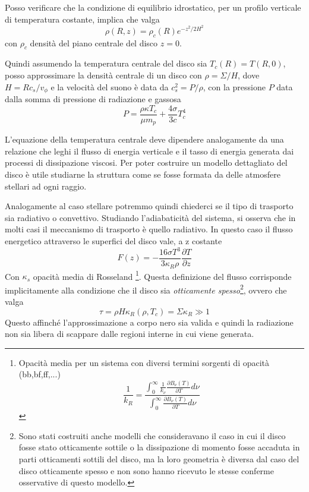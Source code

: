 \documentclass[a4paperbi]{article}
\begin{document}
	Posso verificare che la condizione di equilibrio idrostatico, per un profilo verticale di temperatura costante, implica che valga
	\begin{equation*}
		\rho(R,z)=\rho_c(R)e^{-z^2/2H^2}
	\end{equation*}
	con $\rho_c$ densità del piano centrale del disco $z=0$.
	
	Quindi assumendo la temperatura centrale del disco sia $T_c(R)=T(R,0)$, posso approssimare la densità centrale di un disco con $\rho=\Sigma/H$, dove $H=Rc_s/v_\phi$ e la velocità del suono è data da $c_s^2=P/\rho$, con la pressione $P$ data dalla somma di pressione di radiazione e gassosa
	\begin{equation}
		P=\frac{\rho\kappa T_c}{\mu m_p}+\frac{4\sigma}{3c}T_c^4
	\end{equation}
	
	L'equazione della temperatura centrale deve dipendere analogamente da una relazione che leghi il flusso di energia verticale e il tasso di energia generata dai processi di dissipazione viscosi. Per poter costruire un modello dettagliato del disco è utile studiarne la struttura come se fosse formata da delle atmosfere stellari ad ogni raggio. 
	
	Analogamente al caso stellare potremmo quindi chiederci se il tipo di trasporto sia  radiativo o convettivo. Studiando l'adiabaticità del sistema, si osserva che in molti casi il meccanismo di trasporto è quello radiativo. In questo caso il flusso energetico attraverso le superfici del disco vale, a z costante
	\begin{equation}
		F(z)=-\frac{16\sigma T^3}{3\kappa_R\rho}\frac{\partial T}{\partial z}
	\end{equation}
	Con $\kappa_s$ opacità media di Rosseland
	\footnote{Opacità media per un sistema con diversi termini sorgenti di opacità (bb,bf,ff,...)\begin{equation}
																							\frac{1}{k_R}=\frac{\int_0^\infty\frac{1}{k_\nu}\frac{\partial B_\nu(T)}{\partial T}d\nu}{\int_0^\infty\frac{\partial B_\nu(T)}{\partial T}d\nu}
																						\end{equation}}.
Questa definizione del flusso corrisponde implicitamente alla condizione che il disco sia \textit{otticamente spesso}\footnote{Sono stati costruiti anche modelli che consideravano il caso in cui il disco fosse stato otticamente sottile o la dissipazione di momento fosse accaduta in parti otticamenti sottili del disco, ma la loro geometria è diversa dal caso del disco otticamente spesso e non sono hanno ricevuto le stesse conferme osservative di questo modello.}, ovvero che valga
	\begin{equation}
		\tau=\rho H\kappa_R(\rho,T_c)=\Sigma\kappa_R\gg 1
	\end{equation}
	Questo affinché l'approssimazione a corpo nero sia valida e quindi la radiazione non sia libera di scappare dalle regioni interne in cui viene generata.
	
\end{document}
